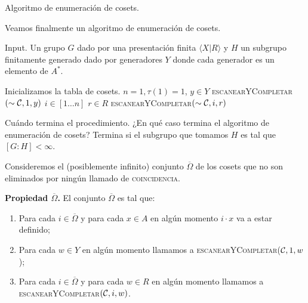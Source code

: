 \documentclass[aspectratio=169, 9pt]{beamer}
\newcommand{\fg}{finitamente generado }
\newcommand{\coin}{\textsc{coincidencia}}
\newcommand{\scanfill}{\textsc{escanearYCompletar}}
\newcommand{\In}{[1 \dots n]}
\newcommand{\ol}{\overline}
\newcommand{\Co}{{\cal{C}}}
\begin{document}
\begin{frame}[fragile]{Algoritmo de enumeración de cosets.}

Veamos finalmente un algoritmo de enumeración de cosets.


\begin{alertblock}{Input.}
	Un grupo $G$ dado por una presentación finita $\langle X | R \rangle$ y $H$ un subgrupo \fg dado por generadores $Y$ donde cada generador es un elemento de $A^*$.
\end{alertblock}
\pause
\begin{codebox}
	\li  \Comment Inicializamos la tabla de cosets.
	\li $n=1, \tau(1)=1$,
	\li \For  $y \in Y$ 
		\Do \li \scanfill$(\sim \Co, 1, y)$  
	\End
	\li \For $i \in \In$
	 \Do \li \For $r \in R$
	 \Do \li \For \scanfill$(\sim \Co, i, r)$
	 \End
	  \End
	\End
\end{codebox}


\end{frame}





\begin{frame}[fragile]{Cuándo termina el procedimiento.}
	¿En qué caso termina el algoritmo de enumeración de cosets?
	\pause
	Termina si el subgrupo que tomamos $H$ es tal que $[G:H] < \infty$.
	\pause

	Consideremos el (posiblemente infinito) conjunto $\ol \Omega$ de los cosets que no son eliminados por ningún llamado de \coin.

	
	\pause
	\textbf{Propiedad $\ol \Omega$.} El conjunto $\ol \Omega$ es tal que:
	\begin{enumerate}
		\item Para cada $i \in \overline \Omega$ y para cada $x \in A$ en algún momento $i \cdot x$ va a estar definido;
		\item Para cada $w \in Y$ en algún momento llamamos a \scanfill($\Co,{1},w$);
		\item Para cada $i \in \ol \Omega$ y para cada $w \in R$ en algún momento llamamos a \scanfill$(\Co,i, w)$.
	\end{enumerate}
\end{frame}
\end{document}

